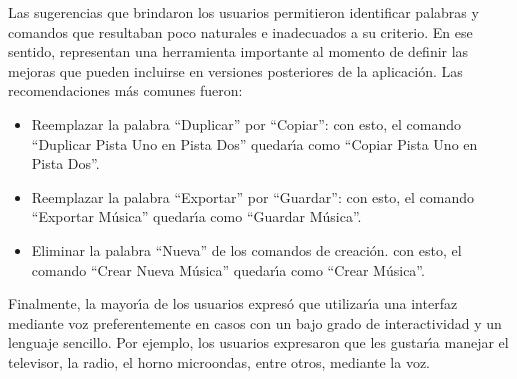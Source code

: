 Las sugerencias que brindaron los usuarios permitieron identificar palabras y comandos que 
resultaban poco naturales e inadecuados a su criterio. En ese sentido, representan una herramienta
importante al momento de definir las mejoras que pueden incluirse en versiones posteriores de la
aplicaci\'on. Las recomendaciones m\'as comunes fueron:

\begin{itemize}
	\item Reemplazar la palabra ``Duplicar'' por ``Copiar'': con esto, el comando 
	``Duplicar Pista Uno en Pista Dos'' quedar{\'\i}a como ``Copiar Pista Uno en Pista Dos''. 
	\item Reemplazar la palabra ``Exportar'' por ``Guardar'': con esto, el comando 
	``Exportar M\'usica'' quedar{\'\i}a como ``Guardar M\'usica''.
	\item Eliminar la palabra ``Nueva'' de los comandos de creaci\'on. con esto, el comando 
	``Crear Nueva M\'usica'' quedar{\'\i}a como ``Crear M\'usica''.
\end{itemize}

Finalmente, la mayor{\'\i}a de los usuarios expres\'o que utilizar{\'\i}a una interfaz mediante voz
preferentemente en casos con un bajo grado de interactividad y un lenguaje sencillo.
Por ejemplo, los usuarios expresaron que les gustar{\'\i}a manejar el televisor, la radio, 
el horno microondas, entre otros, mediante la voz.

